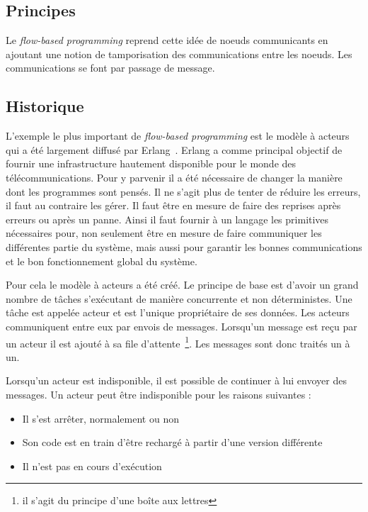 \documentclass{article}
\begin{document}
\subsection{Principes}\label{principes}

Le \emph{flow-based programming} reprend cette idée de noeuds
communicants en ajoutant une notion de tamporisation des communications
entre les noeuds. Les communications se font par passage de message.

\subsection{Historique}\label{historique}
L'exemple le plus important de \emph{flow-based programming} est le modèle à acteurs~\cite{actors}
qui a été largement diffusé par Erlang~\cite{erlang}.
Erlang a comme principal objectif de fournir une infrastructure hautement disponible
pour le monde des télécommunications.
Pour y parvenir il a été nécessaire de changer la manière dont les programmes sont pensés.
Il ne s'agit plus de tenter de réduire les erreurs, il faut au contraire les gérer.
Il faut être en mesure de faire des reprises après erreurs ou après un panne.
Ainsi il faut fournir à un langage les primitives nécessaires pour, non seulement
être en mesure de faire communiquer les différentes partie du système, mais aussi
pour garantir les bonnes communications et le bon fonctionnement global du système.

Pour cela le modèle à acteurs a été créé. Le principe de base est d'avoir un grand
nombre de tâches s'exécutant de manière concurrente et non déterministes.
Une tâche est appelée acteur et est l'unique propriétaire de ses données.
Les acteurs communiquent entre eux par envois de messages.
Lorsqu'un message est reçu par un acteur il est ajouté à sa file d'attente~\footnote{il s'agit du principe d'une boîte aux lettres}.
Les messages sont donc traités un à un.

Lorsqu'un acteur est indisponible, il est possible de continuer à lui envoyer
des messages.
Un acteur peut être indisponible pour les raisons suivantes :
\begin{itemize}
    \item Il s'est arrêter, normalement ou non
    \item Son code est en train d'être rechargé à partir d'une version différente
    \item Il n'est pas en cours d'exécution
\end{itemize}
\end{document}

